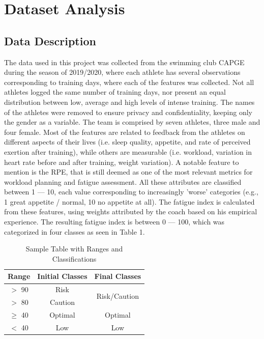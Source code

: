 \documentclass[conference]{IEEEtran}
\begin{document}
\section{Dataset Analysis}
\subsection{Data Description}

The data used in this project was collected from the swimming club CAPGE during the season of 2019/2020, where each athlete has several observations corresponding to training days, where each of the features was collected. Not all athletes logged the same number of training days, nor present an equal distribution between low, average and high levels of intense training. The names of the athletes were removed to ensure privacy and confidentiality, keeping only the gender as a variable. The team is comprised by seven athletes, three male and four female. Most of the features are related to feedback from the athletes on different aspects of their lives (i.e. sleep quality, appetite, and rate of perceived exertion after training), while others are measurable (i.e. workload, variation in heart rate before and after training, weight variation). A notable feature to mention is the RPE, that is still deemed as one of the most relevant metrics for workload planning and fatigue assessment. All these attributes are classified between 1 — 10, each value corresponding to increasingly 'worse' categories (e.g., 1 great appetite / normal, 10 no appetite at all).
The fatigue index is calculated from these features, using weights attributed by the coach based on his empirical experience. The resulting fatigue index is between 0 — 100, which was categorized in four classes as seen in Table 1. 


\begin{table}[H]
\centering
\caption{Sample Table with Ranges and Classifications}
\label{classTable}
\begin{tabular}{|c|c|c|}
    \hline
    \textbf{Range} & \textbf{Initial Classes} & \textbf{Final Classes} \\ \hline
    $>$ 90 & Risk    & \multirow{2}{*}{Risk/Caution} \\ \cline{1-2}
    $>$ 80 & Caution & \\ \hline
    $\geq$ 40 & Optimal & Optimal \\ \hline
    $<$ 40  & Low     & Low \\ \hline
\end{tabular}
\end{table}
\end{document}
